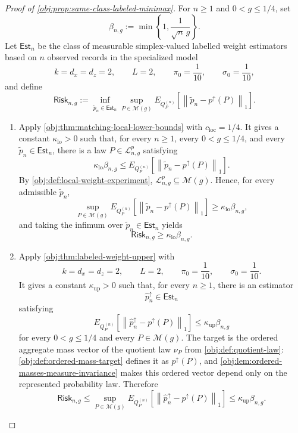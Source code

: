 \documentclass[11pt]{article}
\begin{document}
\begin{proof}[Proof of \cref{obj:prop:same-class-labeled-minimax}]
For \(n\ge 1\) and \(0<g\le 1/4\), set
\[
\beta_{n,g}:=\min\left\{1,\frac{1}{\sqrt n\,g}\right\}.
\]
Let \(\mathsf{Est}_n\) be the class of measurable simplex-valued labelled weight estimators based on \(n\) observed records in the specialized model
\[
k=d_x=d_z=2,\qquad L=2,\qquad \pi_0=\frac1{10},\qquad \sigma_0=\frac1{10},
\]
and define
\[
\mathsf{Risk}_{n,g}
:=
\inf_{\widetilde p_n\in\mathsf{Est}_n}
\sup_{P\in\mathcal M(g)}
E_{Q_P^{(n)}}\!\left[
\left\|\widetilde p_n-p^{\uparrow}(P)\right\|_1
\right].
\]

\begin{enumerate}
\item Apply \cref{obj:thm:matching-local-lower-bounds} with \(c_{\mathrm{loc}}=1/4\). It gives a constant \(\kappa_{\mathrm{lo}}>0\) such that, for every \(n\ge1\), every \(0<g\le1/4\), and every \(\widetilde p_n\in\mathsf{Est}_n\), there is a law \(P\in\mathcal L_{n,g}^{p}\) satisfying
\[
\kappa_{\mathrm{lo}}\beta_{n,g}
\le
E_{Q_P^{(n)}}\!\left[
\left\|\widetilde p_n-p^{\uparrow}(P)\right\|_1
\right].
\]
By \cref{obj:def:local-weight-experiment}, \(\mathcal L_{n,g}^{p}\subseteq\mathcal M(g)\). Hence, for every admissible \(\widetilde p_n\),
\[
\sup_{P\in\mathcal M(g)}
E_{Q_P^{(n)}}\!\left[
\left\|\widetilde p_n-p^{\uparrow}(P)\right\|_1
\right]
\ge
\kappa_{\mathrm{lo}}\beta_{n,g},
\]
and taking the infimum over \(\widetilde p_n\in\mathsf{Est}_n\) yields
\[
\mathsf{Risk}_{n,g}\ge \kappa_{\mathrm{lo}}\beta_{n,g}.
\]

\item Apply \cref{obj:thm:labeled-weight-upper} with
\[
k=d_x=d_z=2,\qquad L=2,\qquad \pi_0=\frac1{10},\qquad \sigma_0=\frac1{10}.
\]
It gives a constant \(\kappa_{\mathrm{up}}>0\) such that, for every \(n\ge1\), there is an estimator
\[
\widehat p_n^{\uparrow}\in\mathsf{Est}_n
\]
satisfying
\[
E_{Q_P^{(n)}}\!\left[
\left\|\widehat p_n^{\uparrow}-p^{\uparrow}(P)\right\|_1
\right]
\le
\kappa_{\mathrm{up}}\beta_{n,g}
\]
for every \(0<g\le1/4\) and every \(P\in\mathcal M(g)\). The target is the ordered aggregate mass vector of the quotient law \(\nu_P\) from \cref{obj:def:quotient-law}: \cref{obj:def:ordered-mass-target} defines it as \(p^{\uparrow}(P)\), and \cref{obj:lem:ordered-masses-measure-invariance} makes this ordered vector depend only on the represented probability law. Therefore
\[
\mathsf{Risk}_{n,g}
\le
\sup_{P\in\mathcal M(g)}
E_{Q_P^{(n)}}\!\left[
\left\|\widehat p_n^{\uparrow}-p^{\uparrow}(P)\right\|_1
\right]
\le
\kappa_{\mathrm{up}}\beta_{n,g}.
\]


\end{enumerate}
\end{proof}
\end{document}
